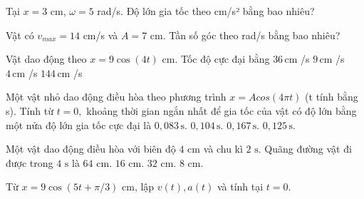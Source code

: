 \begin{ex}
Tại $x=3$ cm, $\omega=5$ rad/s. Độ lớn gia tốc theo cm/s² bằng bao nhiêu?
\end{ex}

\begin{ex}
Vật có $v_{max}=14$ cm/s và $A=7$ cm. Tần số góc theo rad/s bằng bao nhiêu?
\end{ex}

\begin{ex}
Vật dao động theo $x=9\cos(4t)$ cm. Tốc độ cực đại bằng
\choice
{\True $36\,\text{cm}$ /s}
{$9\,\text{cm}$ /s}
{$4\,\text{cm}$ /s}
{$144\,\text{cm}$ /s}
\end{ex}

\begin{ex}
Một vật nhỏ dao động điều hòa theo phương trình $x=Acos\left( 4\pi t \right)$ (t tính bằng s). Tính từ $t=0,$ khoảng thời gian ngắn nhất để gia tốc của vật có độ lớn bằng một nửa độ lớn gia tốc cực đại là
\choice
{\True $0,083\,\text{s}$.}
{$0,104\,\text{s}$.}
{$0,167\,\text{s}$.}
{$0,125\,\text{s}$.}
\end{ex}

\begin{ex}
Một vật dao động điều hòa với biên độ $\text{4 cm}$ và chu kì $\text{2 s}\text{.}$ Quãng đường vật đi được trong $\text{4 s}$ là
\choice
{$\text{64 cm}\text{.}$}
{$\text{16 cm}\text{.}$}
{\True $\text{32 cm}\text{.}$}
{$\text{8 cm}\text{.}$}
\end{ex}

\begin{ex}
Từ $x=9\cos(5t+\pi/3)$ cm, lập $v(t),a(t)$ và tính tại $t=0$.
\choiceTF

\end{ex}

